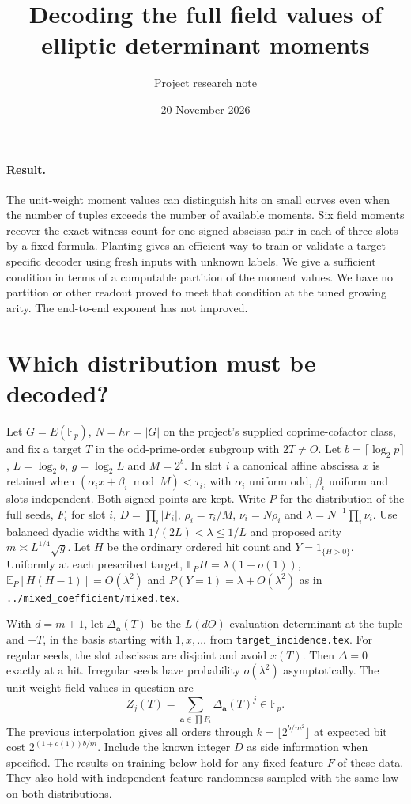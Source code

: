 \documentclass[11pt]{article}
\title{Decoding the full field values of elliptic determinant moments}
\author{Project research note}
\date{20 November 2026}
\newcommand{\E}{\mathbb E}
\newcommand{\F}{\mathbb F}
\begin{document}
\maketitle

\paragraph{Result.}
The unit-weight moment values can distinguish hits on small curves even
when the number of tuples exceeds the number of available moments.
Six field moments recover the exact witness count for one signed
abscissa pair in each of three slots by a fixed formula.
Planting gives an efficient way to train or validate a target-specific
decoder using fresh inputs with unknown labels. We give a sufficient
condition in terms of a computable partition of the moment values.
We have no partition or other readout proved to meet that condition at
the tuned growing arity. The end-to-end exponent has not improved.

\section{Which distribution must be decoded?}
Let $G=E(\F_p)$, $N=hr=|G|$ on the project's supplied coprime-cofactor
class, and fix a target $T$ in the odd-prime-order subgroup with $2T\ne O$.
Let $b=\lceil\log_2 p\rceil$, $L=\log_2 b$, $g=\log_2 L$ and $M=2^b$.
In slot $i$ a canonical affine abscissa $x$ is retained when
$(\alpha_i x+\beta_i\bmod M)<\tau_i$, with $\alpha_i$ uniform odd,
$\beta_i$ uniform and slots independent. Both signed points are kept.
Write $P$ for the distribution of the full seeds,
$F_i$ for slot $i$, $D=\prod_i|F_i|$, $\rho_i=\tau_i/M$,
$\nu_i=N\rho_i$ and $\lambda=N^{-1}\prod_i\nu_i$.
Use balanced dyadic widths with $1/(2L)<\lambda\le1/L$ and proposed arity
$m\asymp L^{1/4}\sqrt g$. Let $H$ be the ordinary ordered hit count
and $Y=1_{\{H>0\}}$. Uniformly at each prescribed target,
$\E_P H=\lambda(1+o(1))$, $\E_P[H(H-1)]=O(\lambda^2)$ and
$P(Y=1)=\lambda+O(\lambda^2)$ as in
\texttt{../mixed\_coefficient/mixed.tex}.

With $d=m+1$, let $\Delta_{\mathbf a}(T)$ be the $L(dO)$ evaluation
determinant at the tuple and $-T$, in the basis starting with $1,x,\ldots$
from \texttt{target\_incidence.tex}. For regular seeds, the slot
abscissas are disjoint and avoid $x(T)$. Then $\Delta=0$ exactly at a
hit. Irregular seeds have probability $o(\lambda^2)$ asymptotically.
The unit-weight field values in question are
\[
 Z_j(T)=\sum_{\mathbf a\in\prod F_i}\Delta_{\mathbf a}(T)^j\in\F_p.
\]
The previous interpolation gives all orders through $k=\lfloor
2^{b/m^2}\rfloor$ at expected bit cost $2^{(1+o(1))b/m}$.
Include the known integer $D$ as side information when specified.
The results on training below hold for any fixed feature $F$ of these
data. They also hold with independent feature randomness sampled with
the same law on both distributions.
\end{document}

